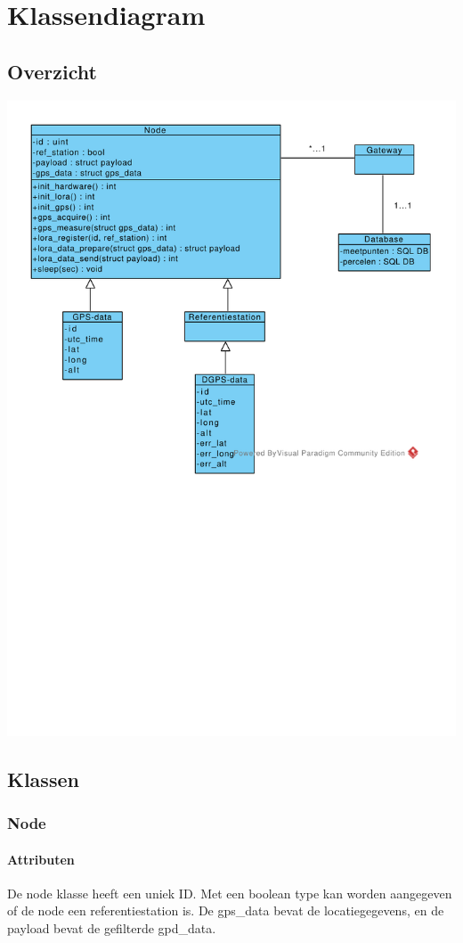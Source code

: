 \section{Klassendiagram}
\subsection{Overzicht}
\includegraphics[width=\textwidth]{technical/class_diagram.pdf}

\subsection{Klassen}
\subsubsection{Node}
\paragraph{Attributen}
De node klasse heeft een uniek ID. Met een boolean type kan worden aangegeven of de node een referentiestation is. De gps\_data bevat de locatiegegevens, en de payload bevat de gefilterde gpd\_data.

